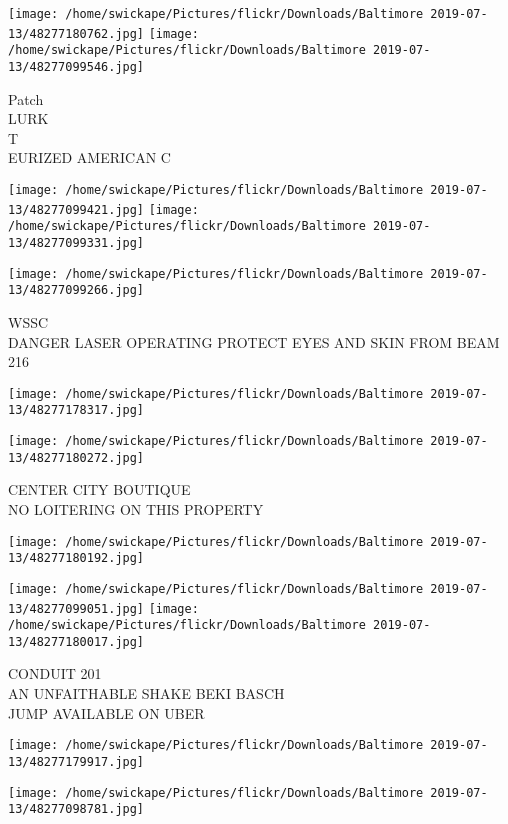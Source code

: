 \documentclass[10pt,letterpaper]{article}
\begin{document}
\texttt{[image: /home/swickape/Pictures/flickr/Downloads/Baltimore 2019-07-13/48277180762.jpg]}
\texttt{[image: /home/swickape/Pictures/flickr/Downloads/Baltimore 2019-07-13/48277099546.jpg]}

Patch\\
LURK\\
T\\
EURIZED AMERICAN C
\pagebreak

\texttt{[image: /home/swickape/Pictures/flickr/Downloads/Baltimore 2019-07-13/48277099421.jpg]}
\texttt{[image: /home/swickape/Pictures/flickr/Downloads/Baltimore 2019-07-13/48277099331.jpg]}

\vspace{0.25in}
\texttt{[image: /home/swickape/Pictures/flickr/Downloads/Baltimore 2019-07-13/48277099266.jpg]}

WSSC\\
DANGER LASER OPERATING PROTECT EYES AND SKIN FROM BEAM\\
216
\pagebreak

\texttt{[image: /home/swickape/Pictures/flickr/Downloads/Baltimore 2019-07-13/48277178317.jpg]}

\vspace{0.25in}
\texttt{[image: /home/swickape/Pictures/flickr/Downloads/Baltimore 2019-07-13/48277180272.jpg]}

CENTER CITY BOUTIQUE\\
NO LOITERING ON THIS PROPERTY
\pagebreak

\texttt{[image: /home/swickape/Pictures/flickr/Downloads/Baltimore 2019-07-13/48277180192.jpg]}

\vspace{0.25in}
\texttt{[image: /home/swickape/Pictures/flickr/Downloads/Baltimore 2019-07-13/48277099051.jpg]}
\texttt{[image: /home/swickape/Pictures/flickr/Downloads/Baltimore 2019-07-13/48277180017.jpg]}

CONDUIT 201\\
AN UNFAITHABLE SHAKE BEKI BASCH\\
JUMP AVAILABLE ON UBER
\pagebreak

\texttt{[image: /home/swickape/Pictures/flickr/Downloads/Baltimore 2019-07-13/48277179917.jpg]}

\vspace{0.25in}
\texttt{[image: /home/swickape/Pictures/flickr/Downloads/Baltimore 2019-07-13/48277098781.jpg]}
\end{document}
